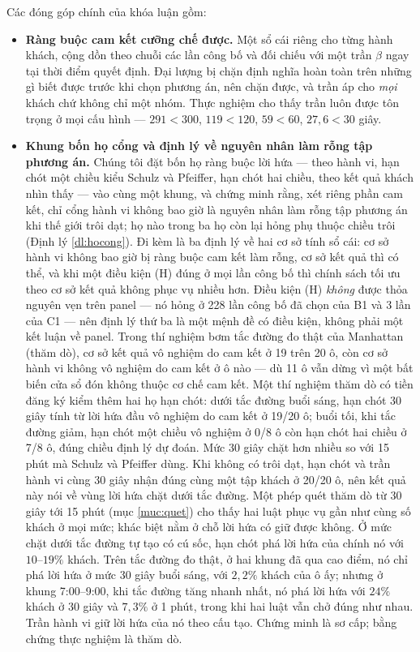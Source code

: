 Các đóng góp chính của khóa luận gồm:

\begin{itemize}[leftmargin=1.2cm,itemsep=3pt,topsep=4pt]
\item \textbf{Ràng buộc cam kết cưỡng chế được.} Một sổ cái riêng cho từng hành khách, cộng dồn
theo chuỗi các lần công bố và đối chiếu với một trần $\beta$ ngay tại thời điểm quyết định.
Đại lượng bị chặn định nghĩa hoàn toàn trên những gì biết được trước khi chọn phương án, nên chặn
được, và trần áp cho \emph{mọi} khách chứ không chỉ một nhóm. Thực nghiệm cho thấy trần luôn được
tôn trọng ở mọi cấu hình --- $291 < 300$, $119 < 120$, $59 < 60$, $27{,}6 < 30$ giây.

\item \textbf{Khung bốn họ cổng và định lý về nguyên nhân làm rỗng tập phương án.} Chúng tôi đặt
bốn họ ràng buộc lời hứa --- theo hành vi, hạn chót một chiều kiểu Schulz và Pfeiffer, hạn chót
hai chiều, theo kết quả khách nhìn thấy --- vào cùng một khung, và chứng minh rằng, xét riêng phần
cam kết, chỉ cổng hành vi không bao giờ là nguyên nhân làm rỗng tập phương án khi thế giới trôi
dạt; họ nào trong ba họ còn lại hỏng phụ thuộc chiều trôi (Định lý \ref{dl:hocong}). Đi kèm là ba
định lý về hai cơ sở tính sổ cái: cơ sở hành vi không bao giờ bị ràng buộc cam kết làm rỗng, cơ sở
kết quả thì có thể, và khi một điều kiện (H) đúng ở mọi lần công bố thì chính sách tối ưu theo cơ
sở kết quả không phục vụ nhiều hơn. Điều kiện (H) \emph{không} được thỏa nguyên vẹn trên panel ---
nó hỏng ở 228 lần công bố đã chọn của B1 và 3 lần của C1 --- nên định lý thứ ba là một mệnh đề có
điều kiện, không phải một kết luận về panel. Trong thí nghiệm bơm tắc đường đo thật của
Manhattan (thăm dò), cơ sở kết quả vô nghiệm do cam kết ở 19 trên 20 ô, còn cơ sở hành vi không
vô nghiệm do cam kết ở ô nào --- dù 11 ô vẫn dừng vì một bất biến cửa sổ đón không thuộc cơ chế cam
kết. Một thí nghiệm thăm dò có tiền đăng ký kiểm thêm hai họ hạn chót: dưới tắc đường buổi sáng, hạn
chót 30 giây tính từ lời hứa đầu vô nghiệm do cam kết ở 19/20 ô; buổi tối, khi tắc đường giảm, hạn
chót một chiều vô nghiệm ở 0/8 ô còn hạn chót hai chiều ở 7/8 ô, đúng chiều định lý dự đoán. Mức 30
giây chặt hơn nhiều so với 15 phút mà Schulz và Pfeiffer dùng. Khi không có trôi dạt, hạn chót và trần
hành vi cùng 30 giây nhận đúng cùng một tập khách ở 20/20 ô, nên kết quả này nói về vùng lời hứa chặt
dưới tắc đường. Một phép quét thăm dò từ 30 giây tới 15 phút (mục \ref{muc:quet}) cho thấy hai luật
phục vụ gần như cùng số khách ở mọi mức; khác biệt nằm ở chỗ lời hứa có giữ được không. Ở mức chặt
dưới tắc đường tự tạo có cú sốc, hạn chót phá lời hứa của chính nó với $10$--$19\%$ khách. Trên tắc đường
đo thật, ở hai khung đã qua cao điểm, nó chỉ phá lời hứa ở mức 30 giây buổi sáng, với $2{,}2\%$ khách của ô ấy;
nhưng ở khung 7:00--9:00, khi tắc đường tăng nhanh nhất, nó phá lời hứa với $24\%$ khách ở 30 giây và $7{,}3\%$ ở
1 phút, trong khi hai luật vẫn chở đúng như nhau. Trần hành vi giữ lời hứa của nó theo cấu tạo. Chứng minh là
sơ cấp; bằng chứng thực nghiệm là thăm dò.


\end{itemize}
